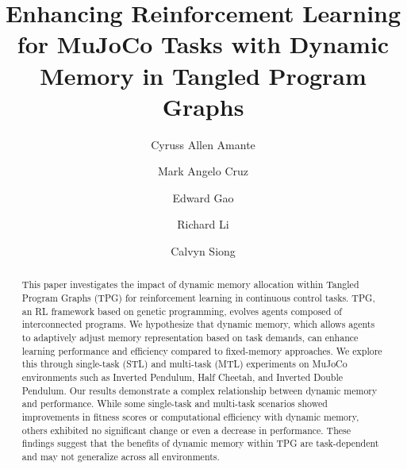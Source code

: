 \documentclass[sigconf]{acmart}
\begin{document}
\title[Dynamic Memory in Tangled Program Graphs]{Enhancing Reinforcement Learning for MuJoCo Tasks with Dynamic Memory in Tangled Program Graphs}

\author{Cyruss Allen Amante}

\author{Mark Angelo Cruz}

\author{Edward Gao}

\author{Richard Li}

\author{Calvyn Siong}



\begin{abstract}
  This paper investigates the impact of dynamic memory allocation within Tangled Program Graphs (TPG) for reinforcement learning in continuous control tasks. TPG, an RL framework based on genetic programming, evolves agents composed of interconnected programs. We hypothesize that dynamic memory, which allows agents to adaptively adjust memory representation based on task demands, can enhance learning performance and efficiency compared to fixed-memory approaches. We explore this through single-task (STL) and multi-task (MTL) experiments on MuJoCo environments such as Inverted Pendulum, Half Cheetah, and Inverted Double Pendulum. Our results demonstrate a complex relationship between dynamic memory and performance. While some single-task and multi-task scenarios showed improvements in fitness scores or computational efficiency with dynamic memory, others exhibited no significant change or even a decrease in performance. These findings suggest that the benefits of dynamic memory within TPG are task-dependent and may not generalize across all environments.
\end{abstract}
  
\end{document}
